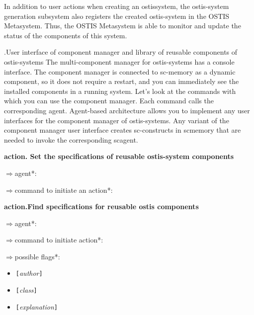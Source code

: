 \documentclass[twocolumn]{article}
\begin{document}
\quad In addition to user actions when creating an ostissystem, the ostis-system generation subsystem also registers the created ostis-system in the OSTIS Metasystem.
Thus, the OSTIS Metasystem is able to monitor and
update the status of the components of this system.                        \hfill\break


{}.User interface of component manager and library
of reusable components of ostis-systems
\hfill\break
\hfill\break
\quad The multi-component manager for ostis-systems has a
console interface. The component manager is connected
to sc-memory as a dynamic component, so it does
not require a restart, and you can immediately see the
installed components in a running system.
\quad Let’s look at the commands with which you can use
the component manager. Each command calls the corresponding agent. Agent-based architecture allows you
to implement any user interfaces for the component
manager of ostis-systems. Any variant of the component manager user interface creates sc-constructs in scmemory that are needed to invoke the corresponding scagent.
 
\hfill\break
\textbf{action. Set the specifications of reusable ostis-system
components
}

$\Rightarrow $\quad agent*: \hfill\break
\begin{d}
\quad\quad [ScComponentManagerInitAgent]
\end{d}

$\Rightarrow $\quad command to initiate an action*: \hfill\break \begin{d}
\quad{}
\end{d}
\hfill\break
\hfill\break
\textbf{action.Find specifications for reusable ostis
components
}

$\Rightarrow $\quad agent*: \hfill\break
\begin{d}
\quad\quad [ScComponentManagerSearchAgent]\hfill\break 
\end{d}
$\Rightarrow $\quad command to initiate action*: \hfill\break
\begin{d}
\quad{}
\end{d}

$\Rightarrow $\quad possible flags*: 


\begin{itemize}
  \setlength{\itemindent}{1em}
    \item\texttt{[}\textit{author}\texttt{]} 
       \item\texttt{[}\textit{class}\texttt{]} 
       \item\texttt{[}\textit{explanation}\texttt{]} 
\end{itemize}
\end{document}
